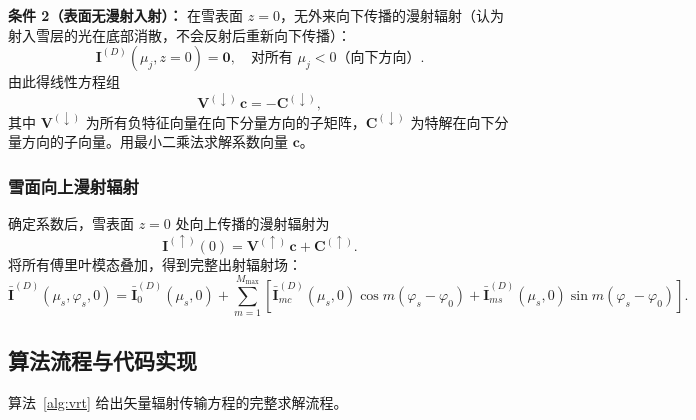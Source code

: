 \documentclass[UTF8,a4paper,12pt]{ctexart}
\begin{document}
\textbf{条件 2（表面无漫射入射）：} 在雪表面 $z=0$，无外来向下传播的漫射辐射（认为射入雪层的光在底部消散，不会反射后重新向下传播）：
\begin{equation}
  \mathbf{I}^{(D)}(\mu_j,z=0) = \mathbf{0},
  \quad\text{对所有 } \mu_j<0 \text{（向下方向）}.
  \label{eq:bc2}
\end{equation}
由此得线性方程组
\begin{equation}
  \mathbf{V}^{(\downarrow)}\,\mathbf{c} = -\mathbf{C}^{(\downarrow)},
  \label{eq:linear-system}
\end{equation}
其中 $\mathbf{V}^{(\downarrow)}$ 为所有负特征向量在向下分量方向的子矩阵，$\mathbf{C}^{(\downarrow)}$ 为特解在向下分量方向的子向量。用最小二乘法求解系数向量 $\mathbf{c}$。

\subsubsection{雪面向上漫射辐射}

确定系数后，雪表面 $z=0$ 处向上传播的漫射辐射为
\begin{equation}
  \mathbf{I}^{(\uparrow)}(0)
  = \mathbf{V}^{(\uparrow)}\,\mathbf{c} + \mathbf{C}^{(\uparrow)}.
  \label{eq:upward}
\end{equation}
将所有傅里叶模态叠加，得到完整出射辐射场：
\begin{equation}
  \bar{\mathbf{I}}^{(D)}(\mu_s,\varphi_s,0)
  = \bar{\mathbf{I}}^{(D)}_0(\mu_s,0)
  + \sum_{m=1}^{M_{\max}}\!\left[
    \bar{\mathbf{I}}^{(D)}_{mc}(\mu_s,0)\cos m(\varphi_s-\varphi_0)
  + \bar{\mathbf{I}}^{(D)}_{ms}(\mu_s,0)\sin m(\varphi_s-\varphi_0)
  \right].
  \label{eq:reconstruct}
\end{equation}

\subsection{算法流程与代码实现}

算法~\ref{alg:vrt} 给出矢量辐射传输方程的完整求解流程。
\end{document}

